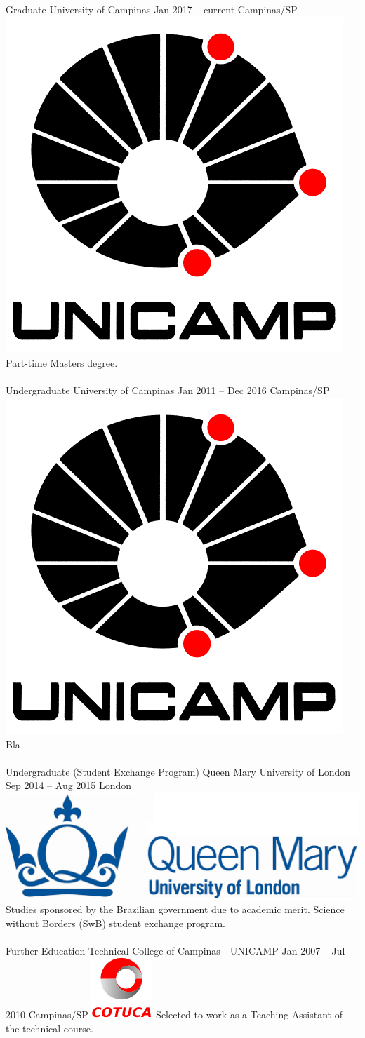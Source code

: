 \documentclass[
	a4paper,
]{fortysecondscv}
\newcommand{\profiledivider}{\textcolor{body!30}{\hdashrule{\linewidth}{0.6pt}{0.5ex}}\\}
\begin{document}
\graphicspath{{../figures/education/}}
    \cvevent
        {Graduate}
        {University of Campinas}
        {Jan 2017 -- current}
        {Campinas/SP}
        {\hspace{2mm}\includegraphics[height=0.07\textwidth]{Unicamp}}
        {Part-time Masters degree.}
    \\\profiledivider
	\cvevent
        {Undergraduate}
        {University of Campinas}
        {Jan 2011 -- Dec 2016}
        {Campinas/SP}
        {\hspace{2mm}\includegraphics[height=0.07\textwidth]{Unicamp}}
        {Bla}
    \\\profiledivider
    \cvevent
        {Undergraduate (Student Exchange Program)}
        {Queen Mary University of London}
        {Sep 2014 -- Aug 2015}
        {London}
        {\hspace{2mm}\includegraphics[height=0.07\textwidth]{QMUL}}
        {Studies sponsored by the Brazilian government due to academic merit. Science without Borders (SwB) student exchange program.}
    \\\profiledivider
	\cvevent
        {Further Education}
        {Technical College of Campinas - UNICAMP}
        {Jan 2007 -- Jul 2010}
        {Campinas/SP}
        {\hspace{2mm}\includegraphics[height=0.07\textwidth]{Cotuca}}
        {Selected to work as a Teaching Assistant of the technical course.}
\end{document}
